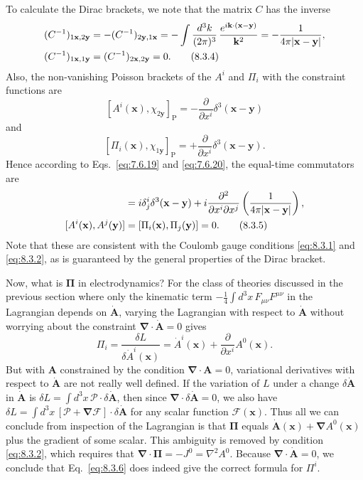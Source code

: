 To calculate the Dirac brackets, we note that the matrix $C$ has the inverse
\begin{align}
  (C^{-1})_{1\mathbf x,2\mathbf y}
  &=-(C^{-1})_{2\mathbf y,1\mathbf x}
  =-\int\frac{d^3k}{(2\pi)^3}\,
  \frac{e^{i\mathbf k\cdot(\mathbf x-\mathbf y)}}{\mathbf k^2}
  =-\frac{1}{4\pi\lvert\mathbf x-\mathbf y\rvert},
  \notag\\
  (C^{-1})_{1\mathbf x,1\mathbf y}
  &=(C^{-1})_{2\mathbf x,2\mathbf y}=0.
  \tag{8.3.4}\label{eq:8.3.4}
\end{align}
Also, the non-vanishing Poisson brackets of the $A^i$ and $\Pi_i$ with the
constraint functions are
\[
  [A^i(\mathbf x),\chi_{2\mathbf y}]_{\mathrm P}
  =-\frac{\partial}{\partial x^i}\delta^3(\mathbf x-\mathbf y)
\]
and
\[
  [\Pi_i(\mathbf x),\chi_{1\mathbf y}]_{\mathrm P}
  =+\frac{\partial}{\partial x^i}\delta^3(\mathbf x-\mathbf y).
\]
Hence according to Eqs.~\eqref{eq:7.6.19} and \eqref{eq:7.6.20}, the equal-time commutators are
\begin{align}
  [A^i(\mathbf x),\Pi_j(\mathbf y)]
  &=i\delta^i_j\delta^3(\mathbf x-\mathbf y)
  +i\frac{\partial^2}{\partial x^i\partial x^j}
  \left(\frac{1}{4\pi\lvert\mathbf x-\mathbf y\rvert}\right),
  \notag\\
  [A^i(\mathbf x),A^j(\mathbf y)]
  &=[\Pi_i(\mathbf x),\Pi_j(\mathbf y)]=0.
  \tag{8.3.5}\label{eq:8.3.5}
\end{align}
Note that these are consistent with the Coulomb gauge conditions \eqref{eq:8.3.1}
and \eqref{eq:8.3.2}, as is guaranteed by the general properties of the Dirac bracket.

Now, what is $\boldsymbol\Pi$ in electrodynamics? For the class of theories
discussed in the previous section where only the kinematic term
$-\tfrac14\int d^3x\,F_{\mu\nu}F^{\mu\nu}$ in the Lagrangian depends on
$\dot{\mathbf A}$, varying the Lagrangian with respect to $\dot{\mathbf A}$
without worrying about the constraint
$\boldsymbol\nabla\cdot\dot{\mathbf A}=0$ gives
\begin{equation}
  \Pi_i=\frac{\delta L}{\delta\dot A^i(\mathbf x)}
  =\dot A^i(\mathbf x)+\frac{\partial}{\partial x^i}A^0(\mathbf x).
  \tag{8.3.6}\label{eq:8.3.6}
\end{equation}
But with $\mathbf A$ constrained by the condition
$\boldsymbol\nabla\cdot\mathbf A=0$, variational derivatives with respect to
$\dot{\mathbf A}$ are not really well defined. If the variation of $L$ under a
change $\delta\dot{\mathbf A}$ in $\dot{\mathbf A}$ is
$\delta L=\int d^3x\,\boldsymbol{\mathcal P}\cdot\delta\dot{\mathbf A}$, then
since $\boldsymbol\nabla\cdot\delta\dot{\mathbf A}=0$, we also have
$\delta L=\int d^3x\,[\boldsymbol{\mathcal P}+\boldsymbol\nabla\mathcal F]
\cdot\delta\dot{\mathbf A}$ for any scalar function $\mathcal F(\mathbf x)$.
Thus all we can conclude from inspection of the Lagrangian is that
$\boldsymbol\Pi$ equals
$\dot{\mathbf A}(\mathbf x)+\boldsymbol\nabla A^0(\mathbf x)$ plus the gradient
of some scalar. This ambiguity is removed by condition \eqref{eq:8.3.2}, which requires
that $\boldsymbol\nabla\cdot\boldsymbol\Pi=-J^0=\nabla^2A^0$. Because
$\boldsymbol\nabla\cdot\dot{\mathbf A}=0$, we conclude that Eq.~\eqref{eq:8.3.6} does
indeed give the correct formula for $\Pi^i$.

